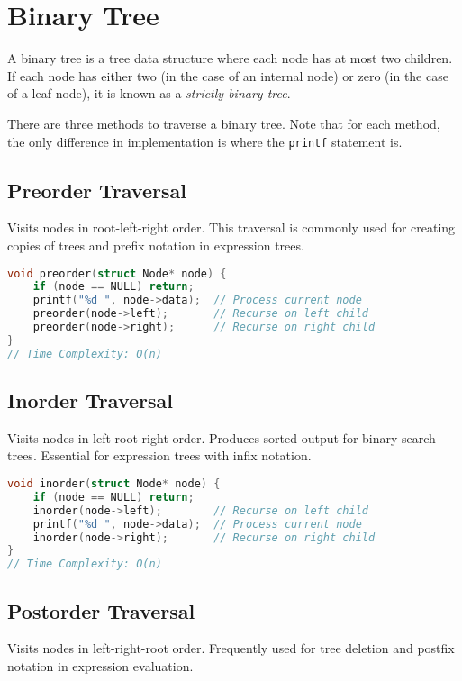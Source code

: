 \section{Binary Tree}

A binary tree is a tree data structure where each node
has at most two children. If each node has either two (in the
case of an internal node) or zero (in the case of a leaf node),
it is known as a \emph{strictly binary tree}.

There are three methods to traverse a binary tree. Note that
for each method, the only difference in implementation is where
the \texttt{printf} statement is.

\subsection{Preorder Traversal}
Visits nodes in root-left-right order. This traversal is commonly used for creating copies of trees and prefix notation in expression trees.

\begin{lstlisting}[language=C, caption=Preorder Traversal Implementation]
void preorder(struct Node* node) {
    if (node == NULL) return;
    printf("%d ", node->data);  // Process current node
    preorder(node->left);       // Recurse on left child
    preorder(node->right);      // Recurse on right child
}
// Time Complexity: O(n)
\end{lstlisting}

\subsection{Inorder Traversal}
Visits nodes in left-root-right order. Produces sorted output for binary search trees. Essential for expression trees with infix notation.

\begin{lstlisting}[language=C, caption=Inorder Traversal Implementation]
void inorder(struct Node* node) {
    if (node == NULL) return;
    inorder(node->left);        // Recurse on left child
    printf("%d ", node->data);  // Process current node
    inorder(node->right);       // Recurse on right child
}
// Time Complexity: O(n)
\end{lstlisting}

\subsection{Postorder Traversal}
Visits nodes in left-right-root order. Frequently used for tree deletion and postfix notation in expression evaluation.

